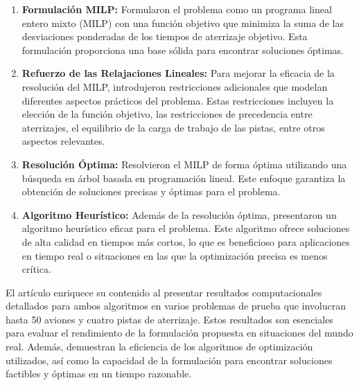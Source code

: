 \documentclass[letter, 10pt]{article}
\begin{document}
\begin{enumerate}
    \item \textbf{Formulaci\'on MILP:} Formularon el problema como un programa lineal entero mixto (MILP) con una funci\'on objetivo que minimiza la suma de las desviaciones ponderadas de los tiempos de aterrizaje objetivo. Esta formulaci\'on proporciona una base s\'olida para encontrar soluciones \'optimas.

    \item \textbf{Refuerzo de las Relajaciones Lineales:} Para mejorar la eficacia de la resoluci\'on del MILP, introdujeron restricciones adicionales que modelan diferentes aspectos pr\'acticos del problema. Estas restricciones incluyen la elecci\'on de la funci\'on objetivo, las restricciones de precedencia entre aterrizajes, el equilibrio de la carga de trabajo de las pistas, entre otros aspectos relevantes.

    \item \textbf{Resoluci\'on \'Optima:} Resolvieron el MILP de forma \'optima utilizando una b\'usqueda en \'arbol basada en programaci\'on lineal. Este enfoque garantiza la obtenci\'on de soluciones precisas y \'optimas para el problema.

    \item \textbf{Algoritmo Heur\'istico:} Adem\'as de la resoluci\'on \'optima, presentaron un algoritmo heur\'istico eficaz para el problema. Este algoritmo ofrece soluciones de alta calidad en tiempos m\'as cortos, lo que es beneficioso para aplicaciones en tiempo real o situaciones en las que la optimizaci\'on precisa es menos cr\'itica.
\end{enumerate}

El art\'iculo enriquece su contenido al presentar resultados computacionales detallados para ambos algoritmos en varios problemas de prueba que involucran hasta 50 aviones y cuatro pistas de aterrizaje. Estos resultados son esenciales para evaluar el rendimiento de la formulaci\'on propuesta en situaciones del mundo real. Adem\'as, demuestran la eficiencia de los algoritmos de optimizaci\'on utilizados, as\'i como la capacidad de la formulaci\'on para encontrar soluciones factibles y \'optimas en un tiempo razonable. \\
\end{document}
